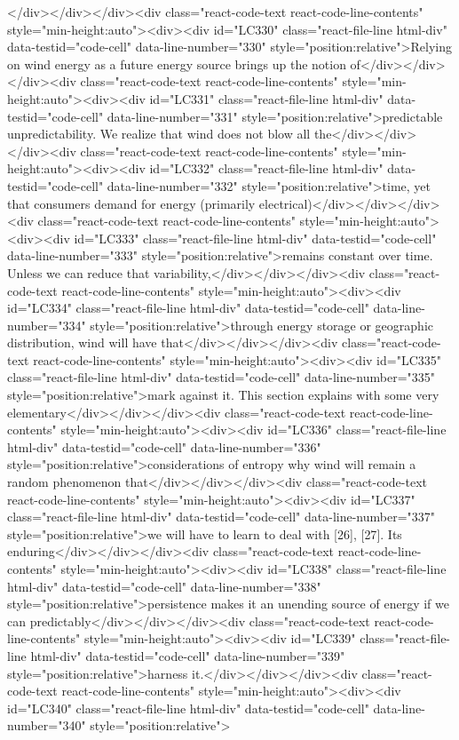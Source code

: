 {{{</div></div></div><div class="react-code-text react-code-line-contents" style="min-height:auto"><div><div id="LC330" class="react-file-line html-div" data-testid="code-cell" data-line-number="330" style="position:relative">Relying on wind energy as a future energy source brings up the notion of</div></div></div><div class="react-code-text react-code-line-contents" style="min-height:auto"><div><div id="LC331" class="react-file-line html-div" data-testid="code-cell" data-line-number="331" style="position:relative">predictable unpredictability. We realize that wind does not blow all the</div></div></div><div class="react-code-text react-code-line-contents" style="min-height:auto"><div><div id="LC332" class="react-file-line html-div" data-testid="code-cell" data-line-number="332" style="position:relative">time, yet that consumers demand for energy (primarily electrical)</div></div></div><div class="react-code-text react-code-line-contents" style="min-height:auto"><div><div id="LC333" class="react-file-line html-div" data-testid="code-cell" data-line-number="333" style="position:relative">remains constant over time. Unless we can reduce that variability,</div></div></div><div class="react-code-text react-code-line-contents" style="min-height:auto"><div><div id="LC334" class="react-file-line html-div" data-testid="code-cell" data-line-number="334" style="position:relative">through energy storage or geographic distribution, wind will have that</div></div></div><div class="react-code-text react-code-line-contents" style="min-height:auto"><div><div id="LC335" class="react-file-line html-div" data-testid="code-cell" data-line-number="335" style="position:relative">mark against it. This section explains with some very elementary</div></div></div><div class="react-code-text react-code-line-contents" style="min-height:auto"><div><div id="LC336" class="react-file-line html-div" data-testid="code-cell" data-line-number="336" style="position:relative">considerations of entropy why wind will remain a random phenomenon that</div></div></div><div class="react-code-text react-code-line-contents" style="min-height:auto"><div><div id="LC337" class="react-file-line html-div" data-testid="code-cell" data-line-number="337" style="position:relative">we will have to learn to deal with {[}26{]}, {[}27{]}. Its enduring</div></div></div><div class="react-code-text react-code-line-contents" style="min-height:auto"><div><div id="LC338" class="react-file-line html-div" data-testid="code-cell" data-line-number="338" style="position:relative">persistence makes it an unending source of energy if we can predictably</div></div></div><div class="react-code-text react-code-line-contents" style="min-height:auto"><div><div id="LC339" class="react-file-line html-div" data-testid="code-cell" data-line-number="339" style="position:relative">harness it.</div></div></div><div class="react-code-text react-code-line-contents" style="min-height:auto"><div><div id="LC340" class="react-file-line html-div" data-testid="code-cell" data-line-number="340" style="position:relative">
}}}
